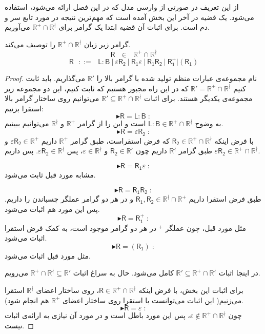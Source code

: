 از این تعریف در صورتی از وارسی مدل که در این فصل ارائه می‌شود، استفاده می‌شود. یک قضیه در آخر این بخش آمده است که مهم‌ترین نتیجه در مورد تابع سر و دم است. 
برای اثبات آن قضیه ابتدا یک گرامر برای $\mathbb{R^+ \cap R^\nmid}$ می‌آوریم.
\begin{thm}
	گرامر زیر زبان $\mathbb{R^+ \cap R^\nmid}$ را توصیف می‌کند.
	$$\mathsf{R} \:\:\:\in\:\:\: \mathbb{R^+ \cap R^\nmid}$$
	$$\mathsf{R}\:\:\: ::= \:\:\: \mathsf{L:B} \: |
	\: \mathsf{\varepsilon R_2} \: | \: \mathsf{R_1 \varepsilon} \: |
	\: \mathsf{R_1 R_2} \: | 
	\: \mathsf{R_1^+} | (\mathsf{R_1})$$
\end{thm}
\begin{proof}
	نام مجموعه‌ی عبارات منظم تولید شده با گرامر بالا را $\mathbb{R'}$ می‌گذاریم. باید ثابت کنیم
	$\mathbb{R'=R^+ \cap R^\nmid}$
	که در این راه مجبور هستیم که ثابت کنیم، این دو مجموعه زیر مجموعه‌ی یکدیگر هستند. برای اثبات 
	$\mathbb{R' \subseteq R^+ \cap R^\nmid}$
	می‌توانیم روی ساختار گرامر بالا استقرا ‌بزنیم:
	$$\blacktriangleright \mathsf{R=L:B}\;:$$
	به وضوح 
	$\mathsf{L:B} \in \mathbb{R^+ \cap R^\nmid}$
	است و این را از گرامر $\mathbb{R^+}$ و $\mathbb{R^\nmid}$ می‌توانیم ببینیم.
	$$\blacktriangleright \mathsf{R=\varepsilon R_2}\;:$$
	با فرض اینکه 
	$\mathsf{R_2} \in \mathbb{R^+ \cap R^\nmid}$
	که فرض استقراست، طبق گرامر $\mathbb{R^+}$ داریم 	$\varepsilon\mathsf{R_2} \in \mathbb{R^+}$ و طبق گرامر $\mathbb{R^\nmid}$ داریم چون 
	$\mathsf{R_2} \in \mathbb{R^\nmid}$
	و
	$\varepsilon \in \mathbb{R^\nmid}$،
	پس 
	$\mathsf{\varepsilon R_2} \in \mathbb{R^\nmid}$.
	پس داریم 
	$\mathsf{\varepsilon R_2} \in \mathbb{R^+ \cap R^\nmid}$.
	
	$$\blacktriangleright \mathsf{R=R_1 \varepsilon}\;:$$
	مشابه مورد قبل ثابت می‌شود.
	
	$$\blacktriangleright \mathsf{R=R_1 R_2}\;:$$
	طبق فرض استقرا داریم 
	$\mathsf{R_1,R_2} \in \mathbb{R^\nmid \cap R^+}$ 
	و در هر دو گرامر عملگر چسباندن را داریم. پس این مورد هم اثبات می‌شود.
	$$\blacktriangleright \mathsf{R=R_1^+}\;:$$
	مثل مورد قبل، چون عملگر $ ^+$ در هر دو گرامر موجود است، به کمک فرض استقرا اثبات می‌شود.
	$$\blacktriangleright \mathsf{R=(R_1)}\;:$$
	مثل مورد قبل اثبات می‌شود.
	
	در اینجا اثبات 
	$\mathbb{R' \subseteq R^+ \cap R^\nmid}$ 
	کامل می‌شود. حال به سراغ اثبات 
	$\mathbb{R^+ \cap R^\nmid \subseteq R'}$
	می‌رویم.
	
	برای اثبات این بخش، با فرض اینکه 
	$\mathsf{R} \in \mathbb{R^+ \cap R^\nmid}$،
	روی ساختار اعضای $\mathbb{R^\nmid}$ استقرا می‌زنیم( این اثبات می‌توانست با استقرا روی ساختار اعضای $\mathbb{R^+}$ هم انجام شود).
	$$\blacktriangleright \mathsf{R=\varepsilon}\;:$$
	چون $\varepsilon \notin \mathbb{R^+ \cap R^\nmid}$، پس این مورد باطل است و در مورد آن نیازی به ارائه‌ی اثبات نیست.
	

\end{proof}
